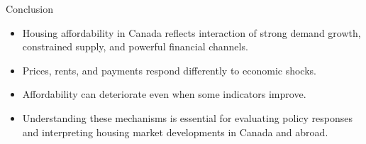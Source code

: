 \documentclass[aspectratio=169]{beamer}
\begin{document}
\begin{frame}{Conclusion}
\transfade
\begin{itemize}[<+->]
  \item Housing affordability in Canada reflects interaction of strong demand growth, constrained supply, and powerful financial channels.
  \item Prices, rents, and payments respond differently to economic shocks.
  \item Affordability can deteriorate even when some indicators improve.
  \item Understanding these mechanisms is essential for evaluating policy responses and interpreting housing market developments in Canada and abroad.
\end{itemize}
\end{frame}
\end{document}
